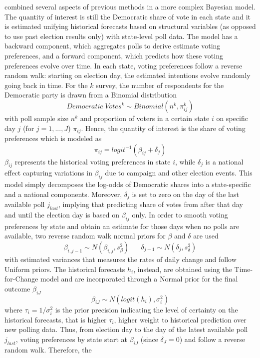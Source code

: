 \documentclass[
  12pt]{article}
\begin{document}
\citet{lin:2013} combined several aspects of previous methods in a more
complex Bayesian model. The quantity of interest is still the Democratic
share of vote in each state and it is estimated unifying historical
forecasts based on structural variables (as opposed to use past election
results only) with state-level poll data. The model has a backward
component, which aggregates polls to derive estimate voting preferences,
and a forward component, which predicts how these voting preferences
evolve over time. In each state, voting preferences follow a reverse
random walk: starting on election day, the estimated intentions evolve
randomly going back in time. For the \(k\) survey, the number of
respondents for the Democratic party is drawn from a Binomial
distribution \[Democratic \; Votes^k \sim Binomial(n^k, \pi_{ij}^k)\]
with poll sample size \(n^k\) and proportion of voters in a certain
state \(i\) on specific day \(j\) (for \(j = 1,...,J\)) \(\pi_{ij}\).
Hence, the quantity of interest is the share of voting preferences which
is modeled as \[\pi_{ij} = logit^{-1}(\beta_{ij} + \delta_j)\]
\(\beta_{ij}\) represents the historical voting preferences in state
\(i\), while \(\delta_j\) is a national effect capturing variations in
\(\beta_{ij}\) due to campaign and other election events. This model
simply decomposes the log-odds of Democratic shares into a
state-specific and a national components. Moreover, \(\delta_j\) is set
to zero on the day of the last available poll \(j_{last}\), implying
that predicting share of votes from after that day and until the
election day is based on \(\beta_{ij}\) only. In order to smooth voting
preferences by state and obtain an estimate for those days when no polls
are available, two reverse random walk normal priors for \(\beta\) and
\(\delta\) are used
\[\beta_{i,j-1} \sim N(\beta_{i,j}, s^2_{\beta}) \;\;\;\;\;\; \delta_{j-1} \sim N(\delta_j, s^2_{\delta})\]
with estimated variances that measures the rates of daily change and
follow Uniform priors. The historical forecasts \(h_i\), instead, are
obtained using the \citet{abr:2008} Time-for-Change model and are
incorporated through a Normal prior for the final outcome \(\beta_{iJ}\)
\[\beta_{iJ} \sim N(logit(h_i), \sigma_i^2)\] where
\(\tau_i = 1 / \sigma_i^2\) is the prior precision indicating the level
of certainty on the historical forecasts, that is higher \(\tau_i\),
higher weight to historical prediction over new polling data. Thus, from
election day to the day of the latest available poll \(j_{last}\),
voting preferences by state start at \(\beta_{iJ}\) (since
\(\delta_J = 0\)) and follow a reverse random walk. Therefore, the
\end{document}
